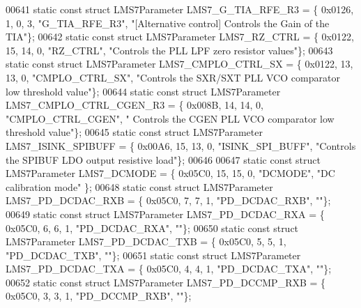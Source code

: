 \begin{DoxyCode}
00641 \textcolor{keyword}{static} \textcolor{keyword}{const} \textcolor{keyword}{struct }LMS7Parameter LMS7_G_TIA_RFE_R3 = \{ 0x0126, 1, 0, 3, \textcolor{stringliteral}{"G\_TIA\_RFE\_R3"}, \textcolor{stringliteral}{"[Alternative
       control] Controls the Gain of the TIA"}\};
00642 \textcolor{keyword}{static} \textcolor{keyword}{const} \textcolor{keyword}{struct }LMS7Parameter LMS7_RZ_CTRL = \{ 0x0122, 15, 14, 0, \textcolor{stringliteral}{"RZ\_CTRL"}, \textcolor{stringliteral}{"Controls the PLL LPF zero
       resistor values"}\};
00643 \textcolor{keyword}{static} \textcolor{keyword}{const} \textcolor{keyword}{struct }LMS7Parameter LMS7_CMPLO_CTRL_SX = \{ 0x0122, 13, 13, 0, \textcolor{stringliteral}{"CMPLO\_CTRL\_SX"}, \textcolor{stringliteral}{"Controls the
       SXR/SXT PLL VCO comparator low threshold value"}\};
00644 \textcolor{keyword}{static} \textcolor{keyword}{const} \textcolor{keyword}{struct }LMS7Parameter LMS7_CMPLO_CTRL_CGEN_R3 = \{ 0x008B, 14, 14, 0, \textcolor{stringliteral}{"CMPLO\_CTRL\_CGEN"}, \textcolor{stringliteral}{"
      Controls the CGEN PLL VCO comparator low threshold value"}\};
00645 \textcolor{keyword}{static} \textcolor{keyword}{const} \textcolor{keyword}{struct }LMS7Parameter LMS7_ISINK_SPIBUFF = \{ 0x00A6, 15, 13, 0, \textcolor{stringliteral}{"ISINK\_SPI\_BUFF"}, \textcolor{stringliteral}{"Controls the
       SPIBUF LDO output resistive load"}\};
00646 
00647 \textcolor{keyword}{static} \textcolor{keyword}{const} \textcolor{keyword}{struct }LMS7Parameter LMS7_DCMODE = \{ 0x05C0, 15, 15, 0, \textcolor{stringliteral}{"DCMODE"}, \textcolor{stringliteral}{"DC calibration mode"} \};
00648 \textcolor{keyword}{static} \textcolor{keyword}{const} \textcolor{keyword}{struct }LMS7Parameter LMS7_PD_DCDAC_RXB = \{ 0x05C0, 7, 7, 1, \textcolor{stringliteral}{"PD\_DCDAC\_RXB"}, \textcolor{stringliteral}{""}\};
00649 \textcolor{keyword}{static} \textcolor{keyword}{const} \textcolor{keyword}{struct }LMS7Parameter LMS7_PD_DCDAC_RXA = \{ 0x05C0, 6, 6, 1, \textcolor{stringliteral}{"PD\_DCDAC\_RXA"}, \textcolor{stringliteral}{""}\};
00650 \textcolor{keyword}{static} \textcolor{keyword}{const} \textcolor{keyword}{struct }LMS7Parameter LMS7_PD_DCDAC_TXB = \{ 0x05C0, 5, 5, 1, \textcolor{stringliteral}{"PD\_DCDAC\_TXB"}, \textcolor{stringliteral}{""}\};
00651 \textcolor{keyword}{static} \textcolor{keyword}{const} \textcolor{keyword}{struct }LMS7Parameter LMS7_PD_DCDAC_TXA = \{ 0x05C0, 4, 4, 1, \textcolor{stringliteral}{"PD\_DCDAC\_TXA"}, \textcolor{stringliteral}{""}\};
00652 \textcolor{keyword}{static} \textcolor{keyword}{const} \textcolor{keyword}{struct }LMS7Parameter LMS7_PD_DCCMP_RXB = \{ 0x05C0, 3, 3, 1, \textcolor{stringliteral}{"PD\_DCCMP\_RXB"}, \textcolor{stringliteral}{""}\};

\end{DoxyCode}
